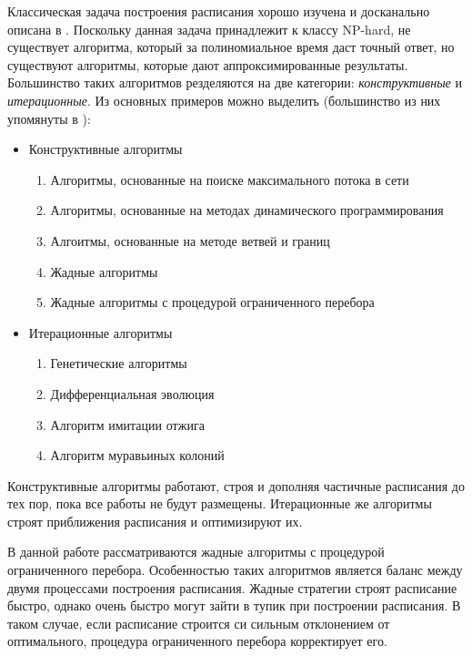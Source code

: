 Классическая задача построения расписания хорошо изучена и досканально описана в \cite{Coffman}. Поскольку данная задача принадлежит к классу NP-hard, не существует алгоритма, который за полиномиальное время даст точный ответ, но существуют алгоритмы, которые дают аппроксимированные результаты. Большинство таких алгоритмов резделяются на две категории: \textit{конструктивные} и \textit{итерационные}. Из основных примеров можно выделить (большинство из них упомянуты в \cite{Kostenko_2017}):
\begin{itemize}
    \item Конструктивные алгоритмы
    \begin{enumerate}
        \item Алгоритмы, основанные на поиске максимального потока в сети
        \item Алгоритмы, основанные на методах динамического программирования
        \item Алгоитмы, основанные на методе ветвей и границ
        \item Жадные алгоритмы
        \item Жадные алгоритмы с процедурой ограниченного перебора
    \end{enumerate}
    \item Итерационные алгоритмы
    \begin{enumerate}
        \item Генетические алгоритмы
        \item Дифференциальная эволюция
        \item Алгоритм имитации отжига
        \item Алгоритм муравьиных колоний
    \end{enumerate}
\end{itemize}
\par
Конструктивные алгоритмы работают, строя и дополняя частичные расписания до тех пор, пока все работы не будут размещены. Итерационные же алгоритмы строят приближения расписания и оптимизируют их.
\par
В данной работе рассматриваются жадные алгоритмы с процедурой ограниченного перебора. Особенностью таких алгоритмов является баланс между двумя процессами построения расписания. Жадные стратегии строят расписание быстро, однако очень быстро могут зайти в тупик при построении расписания. В таком случае, если расписание строится си сильным отклонением от оптимального, процедура ограниченного перебора корректирует его.